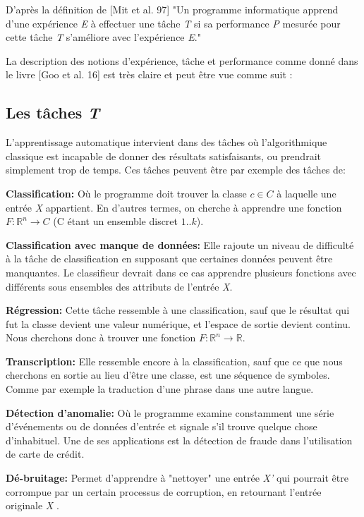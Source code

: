 	D'après la définition de [Mit et al. 97] "Un programme informatique apprend d'une expérience \textit{E} à effectuer une tâche \textit{T} si sa performance \textit{P} mesurée pour cette tâche \textit{T} s'améliore avec l’expérience \textit{E}."

	La description des notions d'expérience, tâche et performance comme donné dans le livre [Goo et al. 16] est très claire et peut être vue comme suit :

\subsection{Les tâches \textit{T}} 
	L'apprentissage automatique intervient dans des tâches où l'algorithmique classique est incapable de donner des résultats satisfaisants, ou prendrait simplement trop de temps. Ces tâches peuvent être par exemple des tâches de:

\textbf{Classification:} Où le programme doit trouver la classe $c \in C$ à laquelle une entrée \textit{X} appartient. En d'autres termes, on cherche à apprendre une fonction $F : \mathbb{R}^{n} \rightarrow C$ (C étant un ensemble discret ${1..k}$).

\textbf{Classification avec manque de données:} Elle rajoute un niveau de difficulté à la tâche de classification en supposant que certaines données peuvent être manquantes. Le classifieur devrait dans ce cas apprendre plusieurs fonctions avec différents sous ensembles des attributs de l'entrée \textit{X}.

\textbf{Régression:} Cette tâche ressemble à une classification, sauf que le résultat qui fut la classe devient une valeur numérique, et l'espace de sortie devient continu. Nous cherchons donc à trouver une fonction $F : \mathbb{R}^{n} \rightarrow \mathbb{R}$.

\textbf{Transcription:} Elle ressemble encore à la classification, sauf que ce que nous cherchons en sortie au lieu d’être une classe, est une séquence de symboles. Comme par exemple la traduction d'une phrase dans une autre langue.

\textbf{Détection d'anomalie:} Où le programme examine constamment une série d’événements ou de données d'entrée et signale s'il trouve quelque chose d'inhabituel. Une de ses applications est la détection de fraude dans l'utilisation de carte de crédit.

\textbf{Dé-bruitage:} Permet d'apprendre à "nettoyer" une entrée \textit{X'} qui pourrait être corrompue par un certain processus de corruption, en retournant l'entrée originale \textit{X} .


